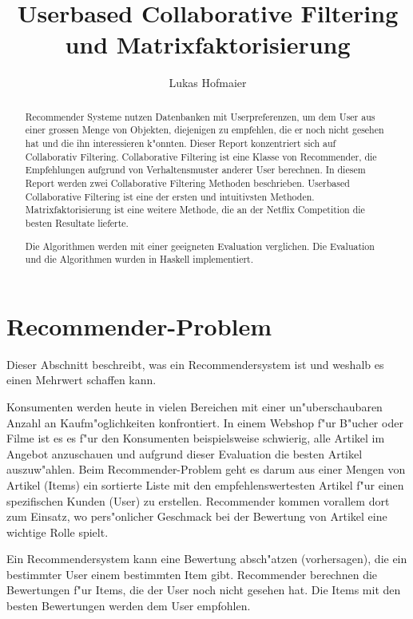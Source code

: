 \documentclass[a4paper, 12pt]{article}
\author{Lukas Hofmaier}
\title{Userbased Collaborative Filtering und Matrixfaktorisierung}
\begin{document}
\lstset{basicstyle=\small,
language=Haskell,
stringstyle=ttfamiliy
}

\maketitle
\newpage
\tableofcontents
\newpage
\begin{abstract}
 Recommender Systeme nutzen Datenbanken mit Userpreferenzen, um dem User aus einer grossen Menge von Objekten, diejenigen zu empfehlen, die er noch nicht gesehen hat und die ihn interessieren k"onnten. Dieser Report konzentriert sich auf Collaborativ Filtering. Collaborative Filtering ist eine Klasse von Recommender, die Empfehlungen aufgrund von Verhaltensmuster anderer User berechnen.
In diesem Report werden zwei Collaborative Filtering Methoden beschrieben. Userbased Collaborative Filtering ist eine der ersten und intuitivsten Methoden. Matrixfaktorisierung ist eine weitere Methode, die an der Netflix Competition die besten Resultate lieferte.

Die Algorithmen werden mit einer geeigneten Evaluation verglichen. Die Evaluation und die Algorithmen wurden in Haskell implementiert.

\end{abstract}

\section{Recommender-Problem}
\label{sec:problem}
Dieser Abschnitt beschreibt, was ein Recommendersystem ist und weshalb es einen Mehrwert schaffen kann.

Konsumenten werden heute in vielen Bereichen mit einer un"uberschaubaren Anzahl an Kaufm"oglichkeiten konfrontiert. In einem Webshop f"ur B"ucher oder Filme ist es es f"ur den Konsumenten beispielsweise schwierig, alle Artikel im Angebot anzuschauen und aufgrund dieser Evaluation die besten Artikel auszuw"ahlen. Beim Recommender-Problem geht es darum aus einer Mengen von Artikel (Items) ein sortierte Liste mit den empfehlenswertesten Artikel f"ur einen spezifischen Kunden (User) zu erstellen. Recommender kommen vorallem dort zum Einsatz, wo pers"onlicher Geschmack bei der Bewertung von Artikel eine wichtige Rolle spielt.

Ein Recommendersystem kann eine Bewertung absch"atzen (vorhersagen), die ein bestimmter User einem bestimmten Item gibt. Recommender berechnen die Bewertungen f"ur Items, die der User noch nicht gesehen hat. Die Items mit den besten Bewertungen werden dem User empfohlen.
\end{document}
